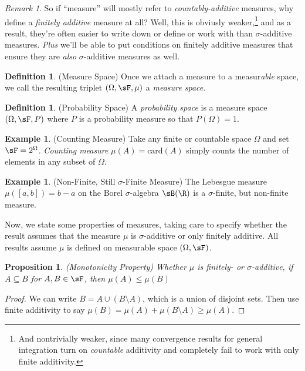 \documentclass[12pt]{article}
\theoremstyle{plain}
\newtheorem{prop}[thm]{Proposition}
\theoremstyle{definition}
\newtheorem{defn}[thm]{Definition}
\newtheorem{ex}[thm]{Example}
\theoremstyle{remark}
\newtheorem*{rmk}{Remark}
\begin{document}
\clearpage
\begin{rmk}
So if ``measure'' will mostly refer to \emph{countably-additive}
measures, why define a \emph{finitely additive} measure at all?
Well, this is obviusly weaker,\footnote{%
  And nontrivially weaker, since many convergence results
  for general integration turn on \emph{countable} additivity and
  completely fail to work with only finite additivity.
}
and as a result, they're often easier to write down or define or work
with than $\sigma$-additive measures. \emph{Plus} we'll be able to put
conditions on finitely additive measures that ensure they are
\emph{also} $\sigma$-additive measures as well.
\end{rmk}

\begin{defn}(Measure Space)
Once we attach a measure to a measur\emph{able} space, we call the
resulting triplet $(\Omega,\sF,\mu)$ a \emph{measure space}.
\end{defn}

\begin{defn}(Probability Space)
A \emph{probability space} is a measure space $(\Omega,\sF,P)$ where $P$
is a probability measure so that $P(\Omega)=1$.
\end{defn}

\begin{ex}(Counting Measure)
Take any finite or countable space $\Omega$ and set $\sF=2^\Omega$.
\emph{Counting measure} $\mu(A) = \text{card}(A)$
simply counts the number of elements in any subset of $\Omega$.
\end{ex}

\begin{ex}(Non-Finite, Still $\sigma$-Finite Measure)
The Lebesgue measure $\mu([a,b])=b-a$ on the Borel $\sigma$-algebra
$\sB(\R)$ is a $\sigma$-finite, but non-finite measure.
\end{ex}


Now, we state some properties of measures, taking care to specify
whether the result assumes that the measure $\mu$ is $\sigma$-additive
or only finitely additive. All results assume $\mu$ is defined on
measurable space $(\Omega,\sF)$.

\begin{prop}\emph{(Monotonicity Property)}
Whether $\mu$ is finitely- or $\sigma$-additive,
if $A\subseteq B$ for $A,B\in\sF$, then
$\mu(A) \leq \mu(B)$
\end{prop}
\begin{proof}
We can write $B = A \cup (B\setminus A)$, which is a union of disjoint
sets. Then use finite additivity to say $\mu(B) = \mu(A) +
\mu(B\setminus A) \geq \mu(A)$.
\end{proof}
\end{document}
